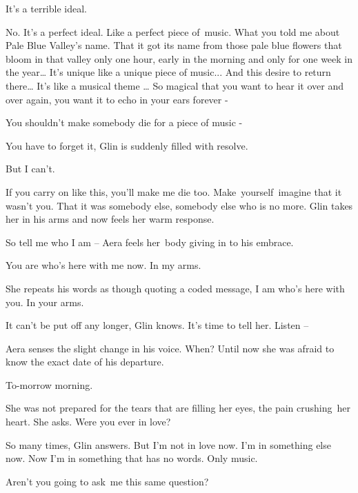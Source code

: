 \documentclass[twoside,11pt]{book}
\begin{document}
{\textquotedbl}It's a terrible ideal.{\textquotedbl} 

{\textquotedbl}No. It's a perfect ideal. Like a perfect piece of~music. What you told me about Pale Blue Valley's name.
That it got its name from those pale blue flowers that bloom in that valley only one hour, early in the morning and
only for one week in the year{\dots} It's unique like a unique piece of music... And this desire to return there{\dots}
It's like a musical theme {\dots} So magical that you want to hear it over and over again, you want it to echo in your
ears forever -{\textquotedbl} 

{\textquotedbl}You shouldn't make somebody die for a piece of music -{\textquotedbl} 

{\textquotedbl}You have to forget it,{\textquotedbl} Glin is suddenly filled with resolve.\ \ 

{\textquotedbl}But I can't.{\textquotedbl} 

{\textquotedbl}If you carry on like this, you'll make me die too.
Make{\ }yourself{\ }imagine that it wasn't you. That it was somebody else, somebody else
who is no more.{\textquotedbl} Glin takes her in his arms and now feels her warm response. 

{\textquotedbl}So tell me who I am -- {\textquotedbl} Aera feels her\ body giving in to his embrace.

{\textquotedbl}You are who's here with me now. In my arms.{\textquotedbl} 

She repeats his words as though quoting a coded message, {\textquotedbl}I am who's here with you. In your
arms.{\textquotedbl}

It can't be put off any longer, Glin knows. It's time to tell her. {\textquotedbl}Listen --{\textquotedbl} 

Aera senses the slight change in his voice. {\textquotedbl}When?{\textquotedbl} Until now she was afraid to know the
exact date of his departure.

{\textquotedbl}To-morrow morning.{\textquotedbl} 

She was not prepared for the tears that are filling her eyes, the pain crushing~her heart. She asks. {\textquotedbl}Were
you ever in love?{\textquotedbl} 

{\textquotedbl}So many times,{\textquotedbl} Glin answers. {\textquotedbl}But I'm not in love now. I'm in something else
now. Now I'm in something that has no words. Only music.{\textquotedbl} ~

{\textquotedbl}Aren't you going to ask~me this same question?{\textquotedbl} 
\end{document}
